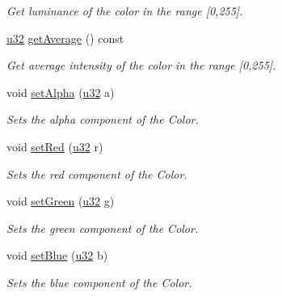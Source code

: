 \begin{DoxyCompactItemize}
\begin{DoxyCompactList}\small\item\em Get luminance of the color in the range \mbox{[}0,255\mbox{]}. \end{DoxyCompactList}\item 
\hyperlink{namespaceirr_a0416a53257075833e7002efd0a18e804}{u32} \hyperlink{classirr_1_1video_1_1SColor_a29a672f4bae9805970b84c4aef81b9ab}{get\+Average} () const \hypertarget{classirr_1_1video_1_1SColor_a29a672f4bae9805970b84c4aef81b9ab}{}\label{classirr_1_1video_1_1SColor_a29a672f4bae9805970b84c4aef81b9ab}

\begin{DoxyCompactList}\small\item\em Get average intensity of the color in the range \mbox{[}0,255\mbox{]}. \end{DoxyCompactList}\item 
void \hyperlink{classirr_1_1video_1_1SColor_a7bfe4abc30d563668b947c8bdb055bab}{set\+Alpha} (\hyperlink{namespaceirr_a0416a53257075833e7002efd0a18e804}{u32} a)
\begin{DoxyCompactList}\small\item\em Sets the alpha component of the Color. \end{DoxyCompactList}\item 
void \hyperlink{classirr_1_1video_1_1SColor_a950c98714711ae9dd8c5219f83c07693}{set\+Red} (\hyperlink{namespaceirr_a0416a53257075833e7002efd0a18e804}{u32} r)
\begin{DoxyCompactList}\small\item\em Sets the red component of the Color. \end{DoxyCompactList}\item 
void \hyperlink{classirr_1_1video_1_1SColor_af80cfedd5e761216b8bed259963ac948}{set\+Green} (\hyperlink{namespaceirr_a0416a53257075833e7002efd0a18e804}{u32} g)
\begin{DoxyCompactList}\small\item\em Sets the green component of the Color. \end{DoxyCompactList}\item 
void \hyperlink{classirr_1_1video_1_1SColor_a13d82e6b52d32f7394f3cce041dc2965}{set\+Blue} (\hyperlink{namespaceirr_a0416a53257075833e7002efd0a18e804}{u32} b)
\begin{DoxyCompactList}\small\item\em Sets the blue component of the Color. \end{DoxyCompactList}\item 

\end{DoxyCompactItemize}
